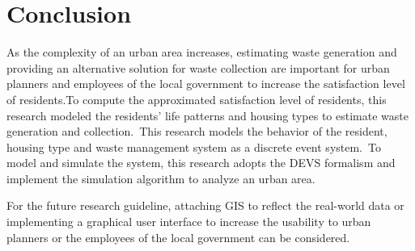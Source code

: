 \documentclass{scsSimAUDPaperFormat}
\begin{document}
\section{Conclusion}
As the complexity of an urban area increases, estimating waste generation and providing an alternative solution for waste collection are important for urban planners and employees of the local government to increase the satisfaction level of residents.To compute the approximated satisfaction level of residents, this research modeled the residents' life patterns and housing types to estimate waste generation and collection.~This research models the behavior of the resident, housing type and waste management system as a discrete event system.~To model and simulate the system, this research adopts the DEVS formalism and implement the simulation algorithm to analyze an urban area. 

For the future research guideline, attaching GIS to reflect the real-world data or implementing a graphical user interface to increase the usability to urban planners or the employees of the local government can be considered.



\balance



\end{document}
